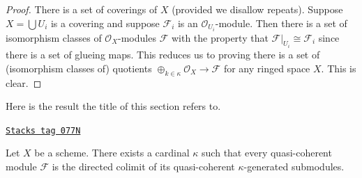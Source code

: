 \begin{proof}
There is a set of coverings of $X$ (provided we disallow repeats).
Suppose $X = \bigcup U_i$ is a covering and suppose $\mathcal{F}_i$
is an $\mathcal{O}_{U_i}$-module. Then there is a set of isomorphism
classes of $\mathcal{O}_X$-modules $\mathcal{F}$ with the property
that $\mathcal{F}|_{U_i} \cong \mathcal{F}_i$ since there is a set of
glueing maps. This reduces us to proving there is a set of (isomorphism
classes of) quotients
$\oplus_{k \in \kappa} \mathcal{O}_X \to \mathcal{F}$
for any ringed space $X$. This is clear.
\end{proof}

Here is the result the title of this section refers to.

\begin{lemma}
\label{properties-lemma-colimit-kappa}
\href{https://stacks.math.columbia.edu/tag/077N}{\texttt{Stacks tag 077N}}

Let $X$ be a scheme. There exists a cardinal $\kappa$ such that
every quasi-coherent module $\mathcal{F}$ is the directed colimit
of its quasi-coherent $\kappa$-generated submodules.
\end{lemma}


